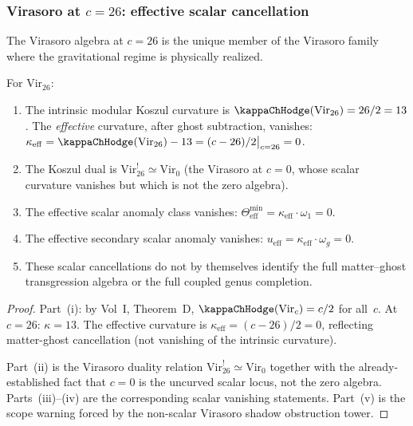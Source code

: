 \subsubsection{Virasoro at $c = 26$: effective scalar cancellation}

The Virasoro algebra at $c = 26$ is the unique member of the
Virasoro family where the gravitational regime is physically
realized.

\begin{proposition}[Virasoro $c = 26$: vanishing effective scalar curvature]
For $\mathrm{Vir}_{26}$:
\begin{enumerate}[label=\textup{(\roman*)}]
\item The intrinsic modular Koszul curvature is
 $\kappaChHodge(\mathrm{Vir}_{26}) = 26/2 = 13$.
 The \emph{effective} curvature, after ghost subtraction, vanishes:
 $\kappa_{\mathrm{eff}} = \kappaChHodge(\mathrm{Vir}_{26}) - 13
 = (c-26)/2\big|_{c=26} = 0$.
\item The Koszul dual is
 $\mathrm{Vir}_{26}^! \simeq \mathrm{Vir}_0$
 (the Virasoro at $c = 0$, whose scalar curvature vanishes
 but which is not the zero algebra).
\item The effective scalar anomaly class vanishes:
 $\Theta^{\min}_{\mathrm{eff}} = \kappa_{\mathrm{eff}} \cdot \omega_1 = 0$.
\item The effective secondary scalar anomaly vanishes:
 $u_{\mathrm{eff}} = \kappa_{\mathrm{eff}} \cdot \omega_g = 0$.
\item These scalar cancellations do not by themselves identify the
 full matter--ghost transgression algebra or the full coupled genus
 completion.
\end{enumerate}
\end{proposition}

\begin{proof}
Part~(i): by Vol~I, Theorem~D, $\kappaChHodge(\mathrm{Vir}_c) = c/2$
for all~$c$. At $c = 26$: $\kappa = 13$. The effective
curvature is $\kappa_{\mathrm{eff}} = (c-26)/2 = 0$,
reflecting matter-ghost cancellation (not vanishing of the
intrinsic curvature).

Part~(ii) is the Virasoro duality relation
$\mathrm{Vir}_{26}^! \simeq \mathrm{Vir}_0$ together with the
already-established fact that $c=0$ is the uncurved scalar locus, not
the zero algebra. Parts~(iii)--(iv) are the corresponding scalar
vanishing statements. Part~(v) is the scope warning forced by the
non-scalar Virasoro shadow obstruction tower.
\end{proof}

